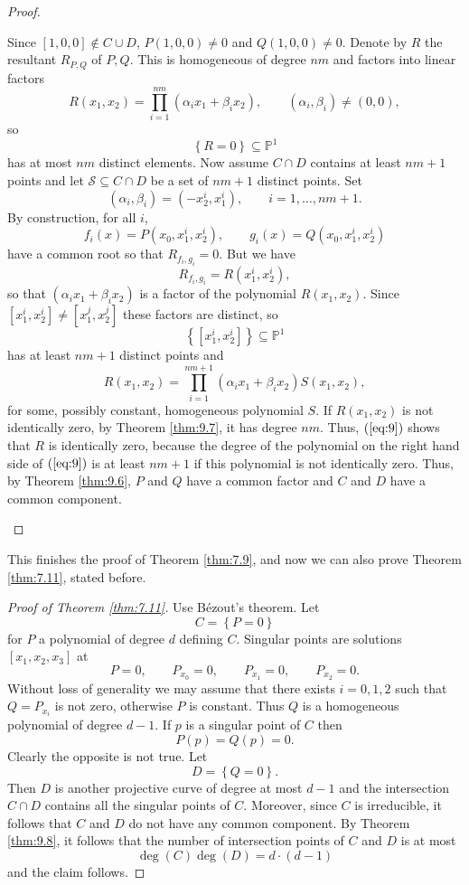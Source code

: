 \documentclass{article}
\renewcommand{\P}{\mathbb{P}}
\renewcommand{\S}{\mathcal{S}}
\newcommand{\rb}[1]{\left( #1 \right)}
\renewcommand{\sb}[1]{\left[ #1 \right]}
\newcommand{\cb}[1]{\left\{ #1 \right\}}
\theoremstyle{definition}\newtheorem{definition}{Definition}[section]
\theoremstyle{definition}\newtheorem{notation}[definition]{Notation}
\theoremstyle{definition}\newtheorem{remark}[definition]{Remark}
\theoremstyle{definition}\newtheorem{example1}[definition]{Example}
\theoremstyle{definition}\newtheorem{fact}{Fact}
\theoremstyle{definition}\newtheorem{exercise}{Exercise}
\theoremstyle{definition}\newtheorem*{example2}{Example}
\begin{document}
\begin{proof}
\begin{enumerate}
Since $ \sb{1, 0, 0} \notin C \cup D $, $ P\rb{1, 0, 0} \ne 0 $ and $ Q\rb{1, 0 , 0} \ne 0 $. Denote by $ R $ the resultant $ R_{P, Q} $ of $ P, Q $. This is homogeneous of degree $ nm $ and factors into linear factors
$$ R\rb{x_1, x_2} = \prod_{i = 1}^{nm}\rb{\alpha_ix_1 + \beta_ix_2}, \qquad \rb{\alpha_i, \beta_i} \ne \rb{0, 0}, $$
so
$$ \cb{R = 0} \subseteq \P^1 $$
has at most $ nm $ distinct elements. Now assume $ C \cap D $ contains at least $ nm + 1 $ points and let $ \S \subseteq C \cap D $ be a set of $ nm + 1 $ distinct points. Set
$$ \rb{\alpha_i, \beta_i} = \rb{-x_2^i, x_1^i}, \qquad i = 1, \dots, nm + 1. $$
By construction, for all $ i $,
$$ f_i\rb{x} = P\rb{x_0, x_1^i, x_2^i}, \qquad g_i\rb{x} = Q\rb{x_0, x_1^i, x_2^i} $$
have a common root so that $ R_{f_i, g_i} = 0 $. But we have
$$ R_{f_i, g_i} = R\rb{x_1^i, x_2^i}, $$
so that $ \rb{\alpha_ix_1 + \beta_ix_2} $ is a factor of the polynomial $ R\rb{x_1, x_2} $. Since $ \sb{x_1^i, x_2^i} \ne \sb{x_1^j, x_2^j} $ these factors are distinct, so
$$ \cb{\sb{x_1^i, x_2^i}} \subseteq \P^1 $$
has at least $ nm + 1 $ distinct points and
\begin{equation}
\label{eq:9}
R\rb{x_1, x_2} = \prod_{i = 1}^{nm + 1} \rb{\alpha_ix_1 + \beta_ix_2}S\rb{x_1, x_2},
\end{equation}
for some, possibly constant, homogeneous polynomial $ S $. If $ R\rb{x_1, x_2} $ is not identically zero, by Theorem \ref{thm:9.7}, it has degree $ nm $. Thus, $ \rb{\ref{eq:9}} $ shows that $ R $ is identically zero, because the degree of the polynomial on the right hand side of $ \rb{\ref{eq:9}} $ is at least $ nm + 1 $ if this polynomial is not identically zero. Thus, by Theorem \ref{thm:9.6}, $ P $ and $ Q $ have a common factor and $ C $ and $ D $ have a common component.
\end{enumerate}
\end{proof}

This finishes the proof of Theorem \ref{thm:7.9}, and now we can also prove Theorem \ref{thm:7.11}, stated before.

\begin{proof}[Proof of Theorem \ref{thm:7.11}]
Use B\'ezout's theorem. Let
$$ C = \cb{P = 0} $$
for $ P $ a polynomial of degree $ d $ defining $ C $. Singular points are solutions $ \sb{x_1, x_2, x_3} $ at
$$ P = 0, \qquad P_{x_0} = 0, \qquad P_{x_1} = 0, \qquad P_{x_2} = 0. $$
Without loss of generality we may assume that there exists $ i = 0, 1, 2 $ such that $ Q = P_{x_i} $ is not zero, otherwise $ P $ is constant. Thus $ Q $ is a homogeneous polynomial of degree $ d - 1 $. If $ p $ is a singular point of $ C $ then
$$ P\rb{p} = Q\rb{p} = 0. $$
Clearly the opposite is not true. Let
$$ D = \cb{Q = 0}. $$
Then $ D $ is another projective curve of degree at most $ d - 1 $ and the intersection $ C \cap D $ contains all the singular points of $ C $. Moreover, since $ C $ is irreducible, it follows that $ C $ and $ D $ do not have any common component. By Theorem \ref{thm:9.8}, it follows that the number of intersection points of $ C $ and $ D $ is at most
$$ \deg\rb{C}\deg\rb{D} = d \cdot \rb{d - 1} $$
and the claim follows.
\end{proof}
\end{document}
